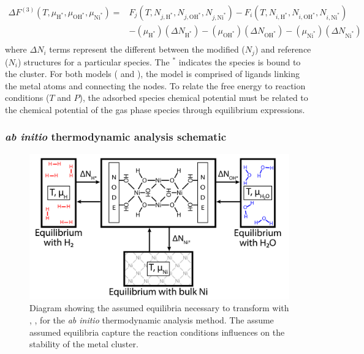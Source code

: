 \documentclass[12pt]{article}
\begin{document}
\begin{equation}
    \begin{split}
        \Delta F^{(3)}(T,\mu_{\text{H}^{*}},\mu_{\text{OH}^{*}},\mu_{\text{Ni}^{*}})  = 
        & F_{j}(T,N_{j,\text{H}^{*}},N_{j,\text{OH}^{*}},N_{j,\text{Ni}^{*}}) - 
          F_{i}(T,N_{i,\text{H}^{*}},N_{i,\text{OH}^{*}},N_{i,\text{Ni}^{*}}) \\
        & - (\mu_{\text{H}^{*}})(\Delta N_{\text{H}^{*}}) - (\mu_{\text{OH}^{*}})(\Delta N_{\text{OH}^{*}}) - (\mu_{\text{Ni}^{*}})(\Delta N_{\text{Ni}^{*}}) \\ 
    \end{split}
    \label{eq:freenergyfinal}
\end{equation}
where $\Delta N_{i}$ terms represent the different between the modified ($N_{j}$) and reference ($N_{i}$) structures for a particular species. The $^{*}$ indicates the species is bound to the cluster. For both models ( and ), the model is comprised of  ligands linking the metal atoms and connecting the  nodes. To relate the free energy to reaction conditions ($T$ and $P$), the adsorbed species chemical potential must be related to the chemical potential of the gas phase species through equilibrium expressions. \\ 

\subsubsection{\textit{ab initio} thermodynamic analysis schematic}
\begin{figure}[H]
    \centering
    \includegraphics{zi-images/00-General-Graphics/FPT-schematic-full.png}
    \caption{Diagram showing the assumed equilibria necessary to transform with , ,  for the \textit{ab initio} thermodynamic analysis method. The assume assumed equilibria capture the reaction conditions influences on the stability of the metal cluster.}
    \label{fig:FPT-process-diagram}
\end{figure}
\end{document}

